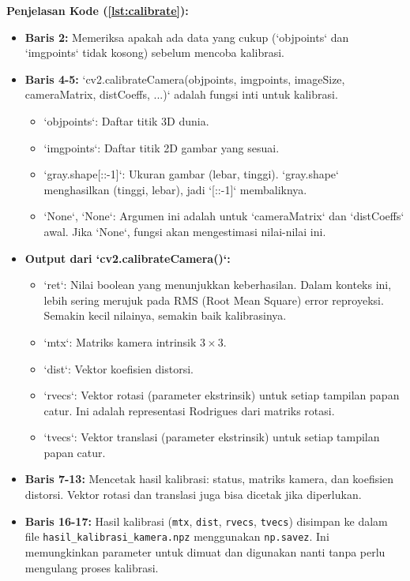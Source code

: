\documentclass[12pt,a4paper]{article}
\begin{document}
\textbf{Penjelasan Kode (\ref{lst:calibrate}):}
\begin{itemize}
    \item \textbf{Baris 2:} Memeriksa apakah ada data yang cukup (`objpoints` dan `imgpoints` tidak kosong) sebelum mencoba kalibrasi.
    \item \textbf{Baris 4-5:} `cv2.calibrateCamera(objpoints, imgpoints, imageSize, cameraMatrix, distCoeffs, ...)` adalah fungsi inti untuk kalibrasi.
          \begin{itemize}
              \item `objpoints`: Daftar titik 3D dunia.
              \item `imgpoints`: Daftar titik 2D gambar yang sesuai.
              \item `gray.shape[::-1]`: Ukuran gambar (lebar, tinggi). `gray.shape` menghasilkan (tinggi, lebar), jadi `[::-1]` membaliknya.
              \item `None`, `None`: Argumen ini adalah untuk `cameraMatrix` dan `distCoeffs` awal. Jika `None`, fungsi akan mengestimasi nilai-nilai ini.
          \end{itemize}
    \item \textbf{Output dari `cv2.calibrateCamera()`:}
          \begin{itemize}
              \item `ret`: Nilai boolean yang menunjukkan keberhasilan. Dalam konteks ini, lebih sering merujuk pada RMS (Root Mean Square) error reproyeksi. Semakin kecil nilainya, semakin baik kalibrasinya.
              \item `mtx`: Matriks kamera intrinsik $3 \times 3$.
              \item `dist`: Vektor koefisien distorsi.
              \item `rvecs`: Vektor rotasi (parameter ekstrinsik) untuk setiap tampilan papan catur. Ini adalah representasi Rodrigues dari matriks rotasi.
              \item `tvecs`: Vektor translasi (parameter ekstrinsik) untuk setiap tampilan papan catur.
          \end{itemize}
    \item \textbf{Baris 7-13:} Mencetak hasil kalibrasi: status, matriks kamera, dan koefisien distorsi. Vektor rotasi dan translasi juga bisa dicetak jika diperlukan.
    \item \textbf{Baris 16-17:} Hasil kalibrasi (\texttt{mtx}, \texttt{dist}, \texttt{rvecs}, \texttt{tvecs}) disimpan ke dalam file \texttt{hasil\_kalibrasi\_kamera.npz} menggunakan \texttt{np.savez}. Ini memungkinkan parameter untuk dimuat dan digunakan nanti tanpa perlu mengulang proses kalibrasi.

\end{itemize}
\end{document}
